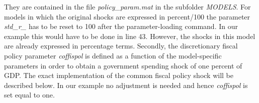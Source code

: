 \begin{itemize}
    They are contained in the file \textit{policy\_param.mat} in the subfolder \textit{MODELS}.
    For models in which the original shocks are expressed in percent/100 the parameter \textit{std\_r\_} has to be reset to 100
    after the parameter-loading command. In our example this would have to be done in line 43. However, the shocks in this model are
    already expressed in percentage terms. Secondly, the discretionary fiscal policy parameter \textit{coffispol} is defined as a function
    of the model-specific parameters in order to obtain a government spending shock of one percent of GDP. The exact
    implementation of the common fiscal policy shock will be described below. In our example no adjustment is
    needed and hence \textit{coffispol} is set equal to one.
\end{itemize}



